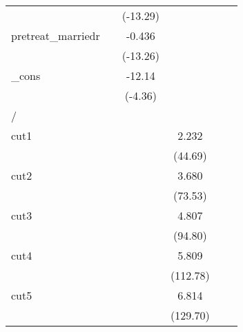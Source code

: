 {\begin{tabular}{l*{5}{c}}
            &                     &    (-13.29)         &                     &                     &                     \\
[1em]
pretreat\_marriedr&                     &      -0.436\sym{***}&                     &                     &                     \\
            &                     &    (-13.26)         &                     &                     &                     \\
[1em]
\_cons      &                     &      -12.14\sym{***}&                     &                     &                     \\
            &                     &     (-4.36)         &                     &                     &                     \\
\hline
/           &                     &                     &                     &                     &                     \\
cut1        &                     &                     &       2.232\sym{***}&                     &                     \\
            &                     &                     &     (44.69)         &                     &                     \\
[1em]
cut2        &                     &                     &       3.680\sym{***}&                     &                     \\
            &                     &                     &     (73.53)         &                     &                     \\
[1em]
cut3        &                     &                     &       4.807\sym{***}&                     &                     \\
            &                     &                     &     (94.80)         &                     &                     \\
[1em]
cut4        &                     &                     &       5.809\sym{***}&                     &                     \\
            &                     &                     &    (112.78)         &                     &                     \\
[1em]
cut5        &                     &                     &       6.814\sym{***}&                     &                     \\
            &                     &                     &    (129.70)         &                     &                     \\

\end{tabular}}
